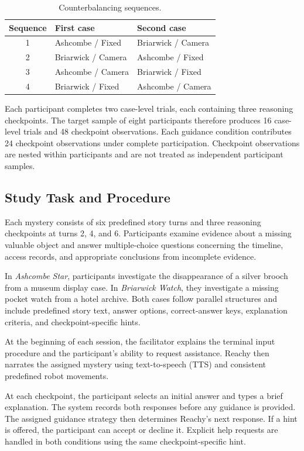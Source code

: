 \documentclass[conference]{IEEEtran}
\begin{document}
\begin{table}[htbp]
\centering
\caption{Counterbalancing sequences.}
\label{tab:counterbalance}
\small
\begin{tabular}{cll}
\toprule
Sequence & First case & Second case \\
\midrule
1 & Ashcombe / Fixed & Briarwick / Camera \\
2 & Briarwick / Camera & Ashcombe / Fixed \\
3 & Ashcombe / Camera & Briarwick / Fixed \\
4 & Briarwick / Fixed & Ashcombe / Camera \\
\bottomrule
\end{tabular}
\end{table}

Each participant completes two case-level trials, each containing three reasoning checkpoints. The target sample of eight participants therefore produces 16 case-level trials and 48 checkpoint observations. Each guidance condition contributes 24 checkpoint observations under complete participation. Checkpoint observations are nested within participants and are not treated as independent participant samples.

\subsection{Study Task and Procedure}

Each mystery consists of six predefined story turns and three reasoning checkpoints at turns 2, 4, and 6. Participants examine evidence about a missing valuable object and answer multiple-choice questions concerning the timeline, access records, and appropriate conclusions from incomplete evidence.

In \emph{Ashcombe Star}, participants investigate the disappearance of a silver brooch from a museum display case. In \emph{Briarwick Watch}, they investigate a missing pocket watch from a hotel archive. Both cases follow parallel structures and include predefined story text, answer options, correct-answer keys, explanation criteria, and checkpoint-specific hints.

At the beginning of each session, the facilitator explains the terminal input procedure and the participant's ability to request assistance. Reachy then narrates the assigned mystery using text-to-speech (TTS) and consistent predefined robot movements.

At each checkpoint, the participant selects an initial answer and types a brief explanation. The system records both responses before any guidance is provided. The assigned guidance strategy then determines Reachy's next response. If a hint is offered, the participant can accept or decline it. Explicit help requests are handled in both conditions using the same checkpoint-specific hint.
\end{document}

